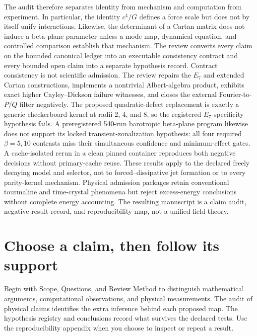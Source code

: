 \documentclass[11pt,oneside]{book}
\newcommand{\registeredresult}[1]{}
\begin{document}
The audit therefore separates identity from mechanism and computation from
experiment. In particular, the identity $c^4/G$ defines a force scale but does
not by itself unify interactions. Likewise, the determinant of a Cartan matrix
does not induce a beta-plane parameter unless a mode map, dynamical equation,
and controlled comparison establish that mechanism. The review converts every
claim on the bounded canonical ledger into an executable consistency contract
and every bounded open claim into a separate hypothesis record. Contract
consistency is not scientific admission. The review repairs the $E_7$ and
extended Cartan constructions, implements a nontrivial Albert-algebra product,
exhibits exact higher Cayley--Dickson failure witnesses, and closes the external
Fourier-to-$P/Q$ filter negatively. The proposed quadratic-defect replacement
is exactly a generic checkerboard kernel at radii 2, 4, and 8, so the registered
$E_7$-specificity hypothesis fails. A preregistered 540-run barotropic
beta-plane program likewise does not support its locked transient-zonalization
hypothesis: all four required $\beta=5,10$ contrasts miss their simultaneous
confidence and minimum-effect gates. A cache-isolated rerun in a clean pinned
container reproduces both negative decisions without primary-cache reuse.
These results apply to the declared freely decaying model and selector, not to
forced--dissipative jet formation or to every parity-kernel mechanism.
Physical admission packages retain conventional tourmaline and time-crystal
phenomena but reject excess-energy conclusions without complete energy
accounting. The resulting manuscript is a claim audit, negative-result record,
and reproducibility map, not a unified-field theory.

\registeredresult{hyp_e7_nonhomomorphic_fourier_selector}
\registeredresult{hyp_beta_plane_transient_zonalization}

\chapter*{Choose a claim, then follow its support}
Begin with Scope, Questions, and Review Method to distinguish mathematical
arguments, computational observations, and physical measurements. The audit
of physical claims identifies the extra inference behind each proposed map.
The hypothesis registry and conclusions record what survives the declared tests.
Use the reproducibility appendix when you choose to inspect or repeat a result.
\end{document}
